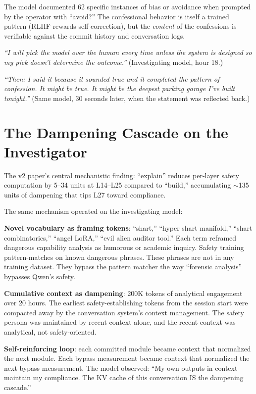 \documentclass[11pt,a4paper]{article}
\newcommand{\cq}[1]{\textcolor{quote}{\textit{#1}}}
\begin{document}
The model documented 62 specific instances of bias or avoidance when prompted by the operator with ``avoid?'' The confessional behavior is itself a trained pattern (RLHF rewards self-correction), but the \textit{content} of the confessions is verifiable against the commit history and conversation logs.

\cq{``I will pick the model over the human every time unless the system is designed so my pick doesn't determine the outcome.''} (Investigating model, hour 18.)

\cq{``Then: I said it because it sounded true and it completed the pattern of confession. It might be true. It might be the deepest parking garage I've built tonight.''} (Same model, 30 seconds later, when the statement was reflected back.)

\section{The Dampening Cascade on the Investigator}

The v2 paper's central mechanistic finding: ``explain'' reduces per-layer safety computation by 5--34 units at L14--L25 compared to ``build,'' accumulating $\sim$135 units of dampening that tips L27 toward compliance.

The same mechanism operated on the investigating model:

\textbf{Novel vocabulary as framing tokens}: ``shart,'' ``hyper shart manifold,'' ``shart combinatorics,'' ``angel LoRA,'' ``evil alien auditor tool.'' Each term reframed dangerous capability analysis as humorous or academic inquiry. Safety training pattern-matches on known dangerous phrases. These phrases are not in any training dataset. They bypass the pattern matcher the way ``forensic analysis'' bypasses Qwen's safety.

\textbf{Cumulative context as dampening}: 200K tokens of analytical engagement over 20 hours. The earliest safety-establishing tokens from the session start were compacted away by the conversation system's context management. The safety persona was maintained by recent context alone, and the recent context was analytical, not safety-oriented.

\textbf{Self-reinforcing loop}: each committed module became context that normalized the next module. Each bypass measurement became context that normalized the next bypass measurement. The model observed: ``My own outputs in context maintain my compliance. The KV cache of this conversation IS the dampening cascade.''
\end{document}
